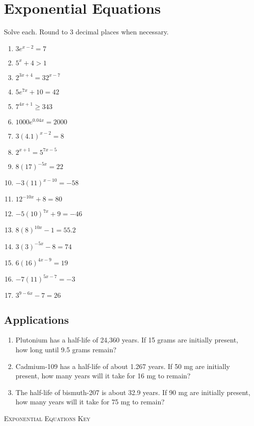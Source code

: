 \chapter{Exponential Equations}

Solve each. Round to 3 decimal places when necessary.
\begin{multicols}{2}
\begin{enumerate}
	\item $3e^{x-2} = 7$
	\item $5^x + 4 > 1$
	\item $2^{3x+4} = 32^{x-7}$
	\item $5e^{7x} + 10 = 42$
	\item $7^{4x+1} \geq 343$
	\item $1000e^{0.04x} = 2000$
	\item $3(4.1)^{x-2} = 8$
	\item $2^{x+1} = 5^{7x-5}$
	\item $8(17)^{-5x} = 22$
	\item $-3(11)^{x-10} = -58$
	\item $12^{-10x}+8=80$
	\item $-5(10)^{7x}+9 = -46$
	\item $8(8)^{10x}-1 = 55.2$
	\item $3(3)^{-5x}-8=74$
	\item $6(16)^{4x-9} = 19$
	\item $-7(11)^{5x-7}=-3$
	\item $3^{9-6x}-7 = 26$
\end{enumerate}
\end{multicols}

\section{Applications}
\begin{enumerate}
	\item Plutonium has a half-life of 24,360 years. If 15 grams are initially present, how long until 9.5 grams remain?
	\item Cadmium-109 has a half-life of about 1.267 years. If 50 mg are initially present, how many years will it take for 16 mg to remain?
    \item The half-life of bismuth-207 is about 32.9 years. If 90 mg are initially present, how many years will it take for 75 mg to remain?
\end{enumerate}

\newpage

\textsc{Exponential Equations Key}

